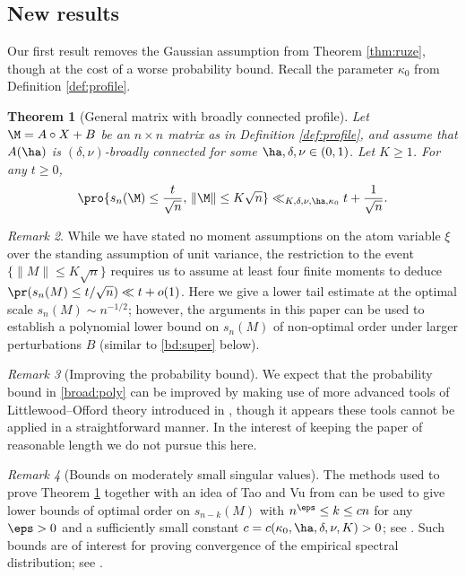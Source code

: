\documentclass[aop,preprint]{imsart}
\theoremstyle{plain}
\newtheorem{theorem}{Theorem}[section]
\theoremstyle{definition}
\theoremstyle{remark}
\newtheorem{remark}[theorem]{Remark}
\numberwithin{equation}{section}
\numberwithin{theorem}{section}
\begin{document}
\subsection{New results}	\label{sec:results}

Our first result removes the Gaussian assumption from Theorem \ref{thm:ruze}, though at the cost of a worse probability bound.
Recall the parameter $\kappa_0$ from Definition \ref{def:profile}.

\begin{theorem}[General matrix with broadly connected profile]		\label{thm:broad}
Let $\M=A\circ X+B$ be an $n\times n$ matrix as in Definition \ref{def:profile}, and assume that $A(\ha)$ is $(\delta,\nu)$-broadly connected for some $\ha,\delta,\nu\in (0,1)$.
Let $K\ge 1$. 
For any $t\ge 0$,
\begin{equation}	\label{broad:poly}
\pro{ s_n(\M) \le \frac{t}{\sqrt{n}}, \, \|\M\| \le K\sqrt{n} } \ll_{K,\delta,\nu,\ha,\kappa_0} t + \frac{1}{\sqrt{n}}.
\end{equation}
\end{theorem}

\begin{remark}	\label{rmk:distribution_broad}
While we have stated no moment assumptions on the atom variable $\xi$ over the standing assumption of unit variance, the restriction to the event $\{\|M\|\le K\sqrt{n}\}$ requires us to assume at least four finite moments to deduce $\pr(s_n(M) \le t/\sqrt{n}) \ll t + o(1)$. 
%
Here we give a lower tail estimate at the optimal scale $s_n(M)\sim n^{-1/2}$; however, the arguments in this paper can be used to establish a polynomial lower bound on $s_n(M)$ of non-optimal order under larger perturbations $B$ (similar to \eqref{bd:super} below). 
\end{remark}

\begin{remark}[Improving the probability bound]
We expect that the probability bound in \eqref{broad:poly} can be improved by making use of more advanced tools of Littlewood--Offord theory introduced in \citep{TaVu:circ, RuVe:ilo}, 
though it appears these tools cannot be applied in a straightforward manner.
In the interest of keeping the paper of reasonable length we do not pursue this here.
\end{remark}

\begin{remark}[Bounds on moderately small singular values]
The methods used to prove Theorem \ref{thm:broad} together with an idea of Tao and Vu from \citep{TaVu:esd} can be used to give lower bounds of optimal order on $s_{n-k}(M)$ with $n^{\eps}\le k \le cn$ for any $\eps>0$ and a sufficiently small constant $c=c(\kappa_0,\ha,\delta,\nu,K)>0$; see \citep[Theorem 4.5.1]{Cook:thesis}. 
Such bounds are of interest for proving convergence of the empirical spectral distribution; see \citep{TaVu:esd, BoCh:survey}.
\end{remark}
\end{document}
